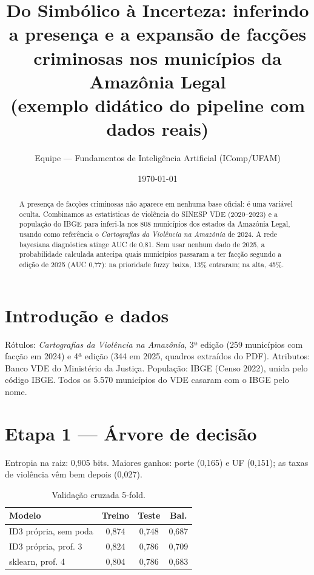 \documentclass[10pt,a4paper,twocolumn]{article}
\title{Do Simbólico à Incerteza: inferindo a presença e a expansão de facções criminosas nos municípios da Amazônia Legal\\
\large (exemplo didático do pipeline com dados reais)}
\author{Equipe — Fundamentos de Inteligência Artificial (IComp/UFAM)}
\date{\today}
\begin{document}
\maketitle

\begin{abstract}
A presença de facções criminosas não aparece em nenhuma base oficial: é uma variável oculta.
Combinamos as estatísticas de violência do SINESP VDE (2020--2023) e a população do IBGE para
inferi-la nos 808 municípios dos estados da Amazônia Legal, usando como referência o
\emph{Cartografias da Violência na Amazônia} de 2024. A rede bayesiana diagnóstica atinge
AUC de 0,81. Sem usar nenhum dado de 2025, a probabilidade calculada antecipa quais municípios
passaram a ter facção segundo a edição de 2025 (AUC 0,77): na prioridade fuzzy baixa, 13\%
entraram; na alta, 45\%.
\end{abstract}

\section{Introdução e dados}
Rótulos: \emph{Cartografias da Violência na Amazônia}, 3ª edição (259 municípios com facção em
2024) e 4ª edição (344 em 2025, quadros extraídos do PDF). Atributos: Banco VDE do Ministério da
Justiça. População: IBGE (Censo 2022), unida pelo código IBGE. Todos os 5.570 municípios do VDE
casaram com o IBGE pelo nome.

\section{Etapa 1 — Árvore de decisão}
Entropia na raiz: 0,905 bits. Maiores ganhos: porte (0,165) e UF (0,151); as taxas de violência
vêm bem depois (0,027).
\begin{table}[h]\centering\small
\begin{tabular}{lccc}\toprule
Modelo & Treino & Teste & Bal.\\\midrule
ID3 própria, sem poda & 0,874 & 0,748 & 0,687\\
ID3 própria, prof. 3 & 0,824 & 0,786 & 0,709\\
sklearn, prof. 4 & 0,804 & 0,786 & 0,683\\\bottomrule
\end{tabular}\caption{Validação cruzada 5-fold.}\end{table}
\end{document}
